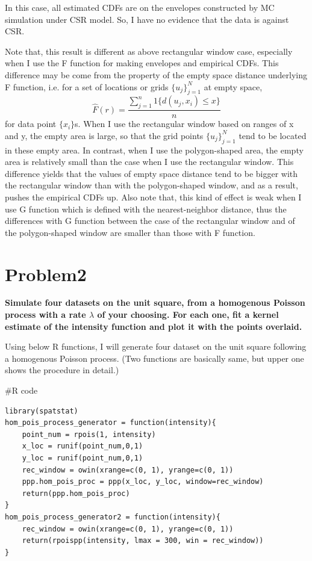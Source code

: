 \documentclass{article}
\newenvironment{Rcode}%
{%
    \begin{mdframed}
    \#R code
    \begin{small}
}
{%
    \end{small}
    \end{mdframed}
}
\begin{document}
In this case, all estimated CDFs are on the envelopes constructed by MC simulation under CSR model.
So, I have no evidence that the data is against CSR.

Note that, this result is different as above rectangular window case,
especially when I use the F function for making envelopes and empirical CDFs.
This difference may be come from the property of the empty space distance
underlying F function, i.e. for a set of locations or grids $\{u_j\}_{j=1}^{N}$ at empty space,
\[\hat{F}(r) = \frac{\sum_{j=1}^{n} 1\{d(u_j, x_i)\leq x\}}{n}\]
for data point $\{x_i\}$s. 
When I use the rectangular window based on ranges of x and y,
the empty area is large, so that the grid points $\{u_j\}_{j=1}^{N}$ tend to
be located in these empty area. In contrast, when I use the polygon-shaped area,
the empty area is relatively small than the case when I use the rectangular window.
This difference yields that the values of empty space distance tend to be bigger with the rectangular window
than with the polygon-shaped window, and as a result, pushes the empirical CDFs up.
Also note that, this kind of effect is weak when I use G function which is defined with the nearest-neighbor distance,
thus the differences with G function between the case of the rectangular window and of the polygon-shaped window are smaller
than those with F function.



\clearpage
\section{Problem2}
\textbf{
Simulate four datasets on the unit square, from a homogenous Poisson process with a rate $\lambda$ of your choosing.
For each one, fit a kernel estimate of the intensity function and plot it with the points overlaid.
}

Using below R functions, I will generate four dataset on the unit square following a homogenous Poisson process.
(Two functions are basically same, but upper one shows the  procedure in detail.)

\begin{Rcode}
    \begin{verbatim}
library(spatstat)
hom_pois_process_generator = function(intensity){
    point_num = rpois(1, intensity)
    x_loc = runif(point_num,0,1)
    y_loc = runif(point_num,0,1)
    rec_window = owin(xrange=c(0, 1), yrange=c(0, 1))
    ppp.hom_pois_proc = ppp(x_loc, y_loc, window=rec_window)
    return(ppp.hom_pois_proc)
}
hom_pois_process_generator2 = function(intensity){
    rec_window = owin(xrange=c(0, 1), yrange=c(0, 1))
    return(rpoispp(intensity, lmax = 300, win = rec_window))
}
    \end{verbatim}
\end{Rcode}
\end{document}
